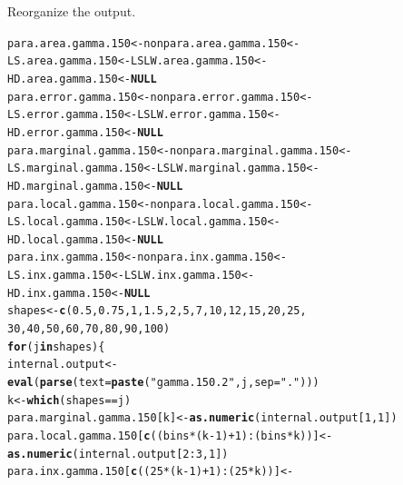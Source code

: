 \documentclass[11pt]{article}\usepackage[]{graphicx}\usepackage[]{color}
\makeatletter
\newcommand{\hlnum}[1]{\textcolor[rgb]{0.686,0.059,0.569}{#1}}%
\newcommand{\hlstr}[1]{\textcolor[rgb]{0.192,0.494,0.8}{#1}}%
\newcommand{\hlopt}[1]{\textcolor[rgb]{0,0,0}{#1}}%
\newcommand{\hlstd}[1]{\textcolor[rgb]{0.345,0.345,0.345}{#1}}%
\newcommand{\hlkwa}[1]{\textcolor[rgb]{0.161,0.373,0.58}{\textbf{#1}}}%
\newcommand{\hlkwb}[1]{\textcolor[rgb]{0.69,0.353,0.396}{#1}}%
\newcommand{\hlkwc}[1]{\textcolor[rgb]{0.333,0.667,0.333}{#1}}%
\newcommand{\hlkwd}[1]{\textcolor[rgb]{0.737,0.353,0.396}{\textbf{#1}}}%
\newenvironment{kframe}{%
 \def\at@end@of@kframe{}%
 \ifinner\ifhmode%
  \def\at@end@of@kframe{\end{minipage}}%
  \begin{minipage}{\columnwidth}%
 \fi\fi%
 \def\FrameCommand##1{\hskip\@totalleftmargin \hskip-\fboxsep
 \colorbox{shadecolor}{##1}\hskip-\fboxsep
     \hskip-\linewidth \hskip-\@totalleftmargin \hskip\columnwidth}%
 \MakeFramed {\advance\hsize-\width
   \@totalleftmargin\z@ \linewidth\hsize
   \@setminipage}}%
 {\par\unskip\endMakeFramed%
 \at@end@of@kframe}
\newenvironment{knitrout}{}{} %
\makeatother
\begin{document}
Reorganize the output.

\begin{knitrout}
\color{fgcolor}\begin{kframe}
\begin{alltt}
\hlstd{para.area.gamma.150} \hlkwb{<-} \hlstd{nonpara.area.gamma.150} \hlkwb{<-}
  \hlstd{LS.area.gamma.150} \hlkwb{<-} \hlstd{LSLW.area.gamma.150} \hlkwb{<-}
  \hlstd{HD.area.gamma.150} \hlkwb{<-} \hlkwa{NULL}
\hlstd{para.error.gamma.150} \hlkwb{<-} \hlstd{nonpara.error.gamma.150} \hlkwb{<-}
  \hlstd{LS.error.gamma.150} \hlkwb{<-} \hlstd{LSLW.error.gamma.150} \hlkwb{<-}
  \hlstd{HD.error.gamma.150} \hlkwb{<-} \hlkwa{NULL}
\hlstd{para.marginal.gamma.150} \hlkwb{<-} \hlstd{nonpara.marginal.gamma.150} \hlkwb{<-}
  \hlstd{LS.marginal.gamma.150} \hlkwb{<-} \hlstd{LSLW.marginal.gamma.150} \hlkwb{<-}
  \hlstd{HD.marginal.gamma.150} \hlkwb{<-} \hlkwa{NULL}
\hlstd{para.local.gamma.150} \hlkwb{<-} \hlstd{nonpara.local.gamma.150} \hlkwb{<-}
  \hlstd{LS.local.gamma.150} \hlkwb{<-} \hlstd{LSLW.local.gamma.150} \hlkwb{<-}
  \hlstd{HD.local.gamma.150} \hlkwb{<-} \hlkwa{NULL}
\hlstd{para.inx.gamma.150} \hlkwb{<-} \hlstd{nonpara.inx.gamma.150} \hlkwb{<-}
  \hlstd{LS.inx.gamma.150} \hlkwb{<-} \hlstd{LSLW.inx.gamma.150} \hlkwb{<-}
  \hlstd{HD.inx.gamma.150} \hlkwb{<-} \hlkwa{NULL}
\hlstd{shapes} \hlkwb{<-} \hlkwd{c}\hlstd{(}\hlnum{0.5}\hlstd{,} \hlnum{0.75}\hlstd{,} \hlnum{1}\hlstd{,} \hlnum{1.5}\hlstd{,} \hlnum{2}\hlstd{,} \hlnum{5}\hlstd{,} \hlnum{7}\hlstd{,} \hlnum{10}\hlstd{,} \hlnum{12}\hlstd{,} \hlnum{15}\hlstd{,} \hlnum{20}\hlstd{,} \hlnum{25}\hlstd{,}
  \hlnum{30}\hlstd{,} \hlnum{40}\hlstd{,} \hlnum{50}\hlstd{,} \hlnum{60}\hlstd{,} \hlnum{70}\hlstd{,} \hlnum{80}\hlstd{,} \hlnum{90}\hlstd{,} \hlnum{100}\hlstd{)}
\hlkwa{for}\hlstd{(j} \hlkwa{in} \hlstd{shapes )\{}
  \hlstd{internal.output} \hlkwb{<-}
    \hlkwd{eval}\hlstd{(}\hlkwd{parse}\hlstd{(}\hlkwc{text}\hlstd{=}\hlkwd{paste}\hlstd{(}\hlstr{"gamma.150.2"}\hlstd{, j,} \hlkwc{sep} \hlstd{=} \hlstr{"."}\hlstd{)))}
  \hlstd{k} \hlkwb{<-} \hlkwd{which}\hlstd{(shapes} \hlopt{==} \hlstd{j)}
  \hlstd{para.marginal.gamma.150[k]} \hlkwb{<-} \hlkwd{as.numeric}\hlstd{(internal.output[}\hlnum{1}\hlstd{,} \hlnum{1}\hlstd{])}
  \hlstd{para.local.gamma.150[}\hlkwd{c}\hlstd{((bins}\hlopt{*}\hlstd{(k}\hlopt{-}\hlnum{1}\hlstd{)}\hlopt{+}\hlnum{1}\hlstd{)}\hlopt{:}\hlstd{(bins}\hlopt{*}\hlstd{k))]} \hlkwb{<-}
    \hlkwd{as.numeric}\hlstd{(internal.output[}\hlnum{2}\hlopt{:}\hlnum{3}\hlstd{,} \hlnum{1}\hlstd{])}
  \hlstd{para.inx.gamma.150[}\hlkwd{c}\hlstd{((}\hlnum{25}\hlopt{*}\hlstd{(k}\hlopt{-}\hlnum{1}\hlstd{)}\hlopt{+}\hlnum{1}\hlstd{)}\hlopt{:}\hlstd{(}\hlnum{25}\hlopt{*}\hlstd{k))]} \hlkwb{<-}

\end{alltt}
\end{kframe}
\end{knitrout}
\end{document}
